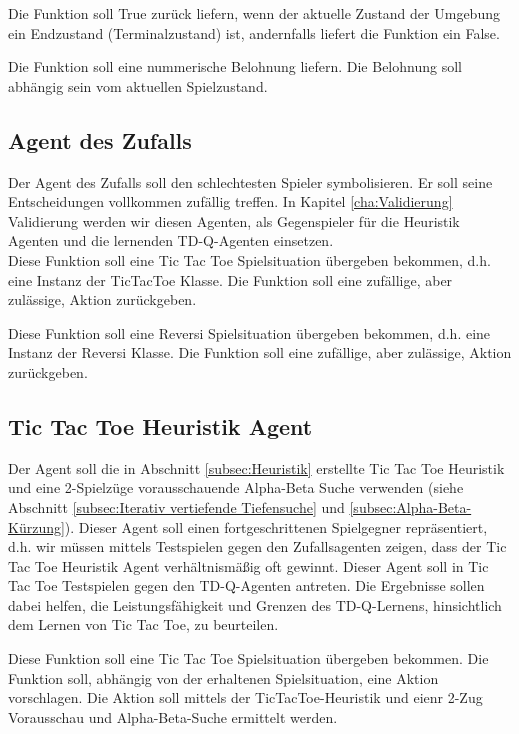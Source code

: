 Die Funktion soll True zurück liefern, wenn der aktuelle Zustand der Umgebung ein Endzustand (Terminalzustand) ist, andernfalls liefert die Funktion ein False.

Die Funktion soll eine nummerische Belohnung liefern. Die Belohnung soll abhängig sein vom aktuellen Spielzustand.

\subsection{Agent des Zufalls}
Der Agent des Zufalls soll den schlechtesten Spieler symbolisieren. Er soll seine Entscheidungen vollkommen zufällig treffen. In Kapitel \ref{cha:Validierung} Validierung werden wir diesen Agenten, als Gegenspieler für die Heuristik Agenten und die lernenden TD-Q-Agenten einsetzen. \\

Diese Funktion soll eine Tic Tac Toe Spielsituation übergeben bekommen, d.h. eine Instanz der TicTacToe Klasse. Die Funktion soll eine zufällige, aber zulässige, Aktion zurückgeben.

Diese Funktion soll eine Reversi Spielsituation übergeben bekommen, d.h. eine Instanz der Reversi Klasse. Die Funktion soll eine zufällige, aber zulässige, Aktion zurückgeben.

\subsection{Tic Tac Toe Heuristik Agent}
Der Agent soll die in Abschnitt \ref{subsec:Heuristik} erstellte Tic Tac Toe Heuristik und eine 2-Spielzüge vorausschauende Alpha-Beta Suche verwenden (siehe Abschnitt \ref{subsec:Iterativ vertiefende Tiefensuche} und \ref{subsec:Alpha-Beta-Kürzung}). Dieser Agent soll einen fortgeschrittenen Spielgegner repräsentiert, d.h. wir müssen mittels Testspielen gegen den Zufallsagenten zeigen, dass der Tic Tac Toe Heuristik Agent verhältnismäßig oft gewinnt. Dieser Agent soll in Tic Tac Toe Testspielen gegen den TD-Q-Agenten antreten. Die Ergebnisse sollen dabei helfen, die Leistungsfähigkeit und Grenzen des TD-Q-Lernens, hinsichtlich dem Lernen von Tic Tac Toe, zu beurteilen. 

Diese Funktion soll eine Tic Tac Toe Spielsituation übergeben bekommen. Die Funktion soll, abhängig von der erhaltenen Spielsituation, eine Aktion vorschlagen. Die Aktion soll mittels der TicTacToe-Heuristik und eienr 2-Zug Vorausschau und Alpha-Beta-Suche ermittelt werden.

